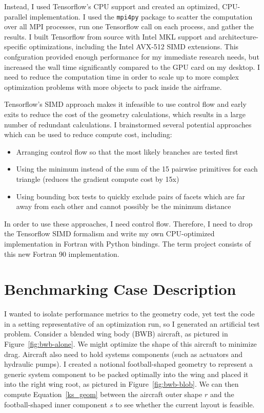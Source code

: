 \documentclass[11pt,letterpaper]{article}
\begin{document}
\qquad Instead, I used Tensorflow's CPU support and created an optimized, CPU-parallel implementation.
I used the \texttt{mpi4py} package to scatter the computation over all MPI processes, run one Tensorflow call on each process, and gather the results.
I built Tensorflow from source with Intel MKL support and architecture-specific optimizations, including the Intel AVX-512 SIMD extensions.
This confguration provided enough performance for my immediate research needs, but increased the wall time significantly compared to the GPU card on my desktop.
I need to reduce the computation time in order to scale up to more complex optimization problems with more objects to pack inside the airframe.

\qquad Tensorflow's SIMD approach makes it infeasible to use control flow and early exits to reduce the cost of the geometry calculations, which results in a large number of redundant calculations.
I brainstormed several potential approaches which can be used to reduce compute cost, including:
\begin{itemize}
  \item Arranging control flow so that the most likely branches are tested first
  \item Using the minimum instead of the sum of the 15 pairwise primitives for each triangle (reduces the gradient compute cost by 15x)
  \item Using bounding box tests to quickly exclude pairs of facets which are far away from each other and cannot possibly be the minimum distance
\end{itemize}
In order to use these approaches, I need control flow.
Therefore, I need to drop the Tensorflow SIMD formalism and write my own CPU-optimized implementation in Fortran with Python bindings.
The term project consists of this new Fortran 90 implementation.

\section{Benchmarking Case Description}
\label{sec:benchmark}
\qquad I wanted to isolate performance metrics to the geometry code, yet test the code in a setting representative of an optimization run, so I generated an artificial test problem.
Consider a blended wing body (BWB) aircraft, as pictured in Figure~\ref{fig:bwb-alone}.
We might optimize the shape of this aircraft to minimize drag.
Aircraft also need to hold systems components (such as actuators and hydraulic pumps).
I created a notional football-shaped geometry to represent a generic system component to be packed optimally into the wing and placed it into the right wing root, as pictured in Figure~\ref{fig:bwb-blob}.
We can then compute Equation~\ref{ks_geom} between the aircraft outer shape $r$ and the football-shaped inner component $s$ to see whether the current layout is feasible.
\end{document}
